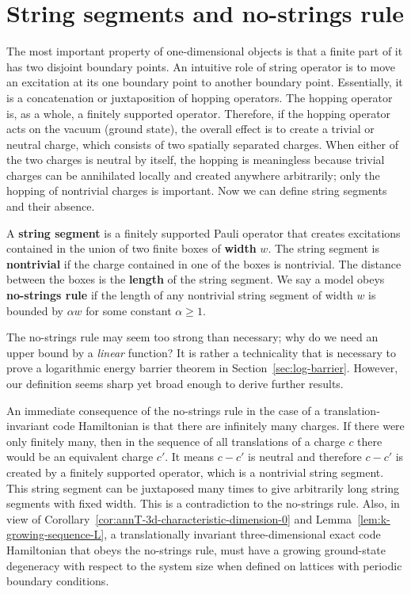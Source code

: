 \section{String segments and no-strings rule}

The most important property of one-dimensional objects
is that a finite part of it has two disjoint boundary points.
An intuitive role of string operator 
is to move an excitation at its one boundary point
to another boundary point.
Essentially, it is a concatenation or juxtaposition of hopping operators.
%
The hopping operator is, as a whole, a finitely supported operator.
Therefore, if the hopping operator acts on the vacuum (ground state),
the overall effect is to create a trivial or neutral charge,
which consists of two spatially separated charges.
When either of the two charges is neutral by itself,
the hopping is meaningless 
because trivial charges can be annihilated locally
and created anywhere arbitrarily;
only the hopping of nontrivial charges is important.
Now we can define string segments and their absence.
\begin{defn}
\cite{Haah2011Local,BravyiHaah2011Energy}
A {\bf string segment} is a finitely supported Pauli operator
that creates excitations contained in the union of two finite boxes
of {\bf width} $w$.
The string segment is {\bf nontrivial} 
if the charge contained in one of the boxes is nontrivial.
The distance between the boxes is the {\bf length} of the string segment.
We say a model obeys {\bf no-strings rule}
if the length of any nontrivial string segment of width $w$
is bounded by $\alpha w$ for some constant $\alpha \ge 1$.
\label{defn:no-strings}
\end{defn}
\noindent
The no-strings rule may seem too strong than necessary;
why do we need an upper bound by a \emph{linear} function?
It is rather a technicality 
that is necessary to prove a logarithmic energy barrier theorem
in Section~\ref{sec:log-barrier}.
However, our definition seems sharp yet broad enough to derive further results.


An immediate consequence of the no-strings rule
in the case of a translation-invariant code Hamiltonian
is that there are infinitely many charges.
If there were only finitely many,
then in the sequence of all translations of a charge $c$
there would be an equivalent charge $c'$.
It means $c - c'$ is neutral 
and therefore $c-c'$ is created by a finitely supported operator,
which is a nontrivial string segment.
This string segment can be juxtaposed many times
to give arbitrarily long string segments with fixed width.
This is a contradiction to the no-strings rule.
Also, in view of Corollary~\ref{cor:annT-3d-characteristic-dimension-0}
and Lemma~\ref{lem:k-growing-sequence-L},
a translationally invariant three-dimensional exact code Hamiltonian that obeys the no-strings rule,
must have a growing ground-state degeneracy with respect to the system size
when defined on lattices with periodic boundary conditions.


